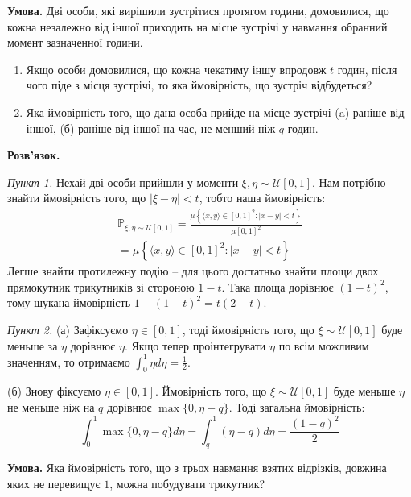 \documentclass[oneside,solution]{karazin-prob-theory-assign}
\begin{document}

\hspace{20px}\textbf{Умова.} Дві особи, які вирішили зустрітися протягом години, домовилися, що кожна незалежно від іншої приходить на місце зустрічі у навмання обранний момент зазначенної години.

\begin{enumerate}
    \item Якщо особи домовилися, що кожна чекатиму іншу впродовж $t$ годин, після чого піде з місця зустрічі, то яка ймовірність, що зустріч відбудеться?
    \item Яка ймовірність того, що дана особа прийде на місце зустрічі (a) раніше від іншої, (б) раніше від іншої на час, не менший ніж $q$ годин.
\end{enumerate}


\textbf{Розв'язок.} 

\textit{Пункт 1.} Нехай дві особи прийшли у моменти $\xi,\eta \sim \mathcal{U}[0,1]$. Нам потрібно знайти ймовірність того, що $|\xi-\eta|<t$, тобто наша ймовірність:
\begin{gather}
    \mathbb{P}_{\xi,\eta \sim \mathcal{U}[0,1]} = \frac{\mu\left\{\langle x,y \rangle \in [0,1]^2: |x-y|<t\right\}}{\mu [0,1]^2}\\ = \mu\left\{\langle x,y \rangle \in [0,1]^2: |x-y|<t\right\}
\end{gather}
Легше знайти протилежну подію -- для цього достатньо знайти площи двох прямокутник трикутників зі стороною $1-t$. Така площа дорівнює $(1-t)^2$, тому шукана ймовірність $1-(1-t)^2=\boxed{t(2-t)}$. 

\textit{Пункт 2.} (а) Зафіксуємо $\eta \in [0,1]$, тоді ймовірність того, що $\xi \sim \mathcal{U}[0,1]$ буде меньше за $\eta$ дорівнює $\eta$. Якщо тепер проінтегрувати $\eta$ по всім можливим значенням, то отримаємо $\int_0^1\eta d\eta = \boxed{\frac{1}{2}}$. 

(б) Знову фіксуємо $\eta \in [0,1]$. Ймовірність того, що $\xi \sim \mathcal{U}[0,1]$ буде меньше $\eta$ не меньше ніж на $q$ дорівнює $\max\{0,\eta-q\}$. Тоді загальна ймовірність:
\begin{equation}
    \int_0^1 \max\{0,\eta-q\}d\eta = \int_q^1 (\eta-q)d\eta = \boxed{\frac{(1-q)^2}{2}}
\end{equation}


\hspace{20px}\textbf{Умова.} Яка ймовірність того, що з трьох навмання взятих відрізків, довжина яких не перевищує $1$, можна побудувати трикутник?
\end{document}
